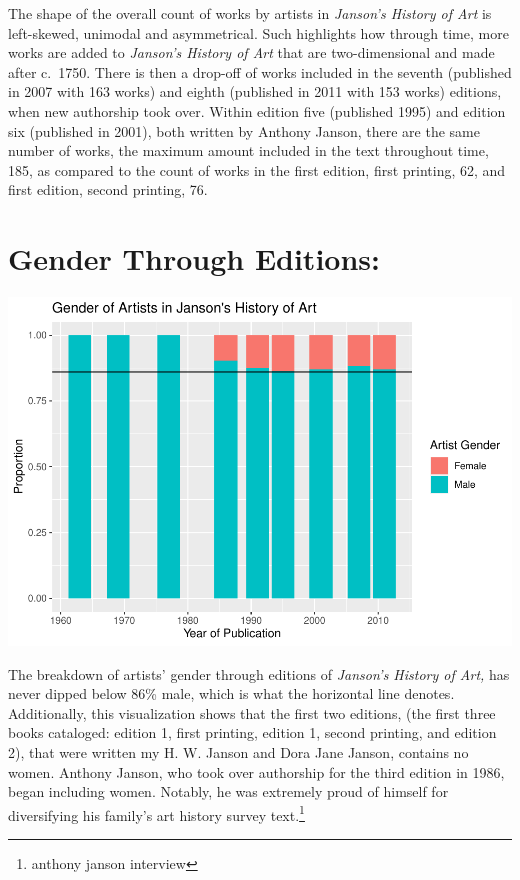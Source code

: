 \documentclass[
  letterpaper,
  DIV=11,
  numbers=noendperiod]{scrreprt}
\begin{document}
The shape of the overall count of works by artists in \emph{Janson's
History of Art} is left-skewed, unimodal and asymmetrical. Such
highlights how through time, more works are added to \emph{Janson's
History of Art} that are two-dimensional and made after c.~1750. There
is then a drop-off of works included in the seventh (published in 2007
with 163 works) and eighth (published in 2011 with 153 works) editions,
when new authorship took over. Within edition five (published 1995) and
edition six (published in 2001), both written by Anthony Janson, there
are the same number of works, the maximum amount included in the text
throughout time, 185, as compared to the count of works in the first
edition, first printing, 62, and first edition, second printing, 76.

\hypertarget{gender-through-editions}{%
\section{\texorpdfstring{\textbf{Gender Through
Editions:}}{Gender Through Editions:}}\label{gender-through-editions}}

\includegraphics{Chapter1/Chapter1_files/figure-pdf/jansongenderthroughtime-1.pdf}

The breakdown of artists' gender through editions of \emph{Janson's
History of Art,} has never dipped below 86\% male, which is what the
horizontal line denotes. Additionally, this visualization shows that the
first two editions, (the first three books cataloged: edition 1, first
printing, edition 1, second printing, and edition 2), that were written
my H. W. Janson and Dora Jane Janson, contains no women. Anthony Janson,
who took over authorship for the third edition in 1986, began including
women. Notably, he was extremely proud of himself for diversifying his
family's art history survey text.\footnote{anthony janson interview}
\end{document}
